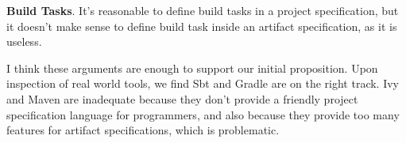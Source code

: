 \textbf{Build Tasks}. It's reasonable to define build tasks in a project specification, but it doesn't make sense to define build task inside an artifact specification, as it is useless.

I think these arguments are enough to support our initial proposition. Upon inspection of real world tools, we find Sbt and Gradle are on the right track. Ivy and Maven are inadequate because they don't provide a friendly project specification language for programmers, and also because they provide too many features for artifact specifications, which is problematic.


